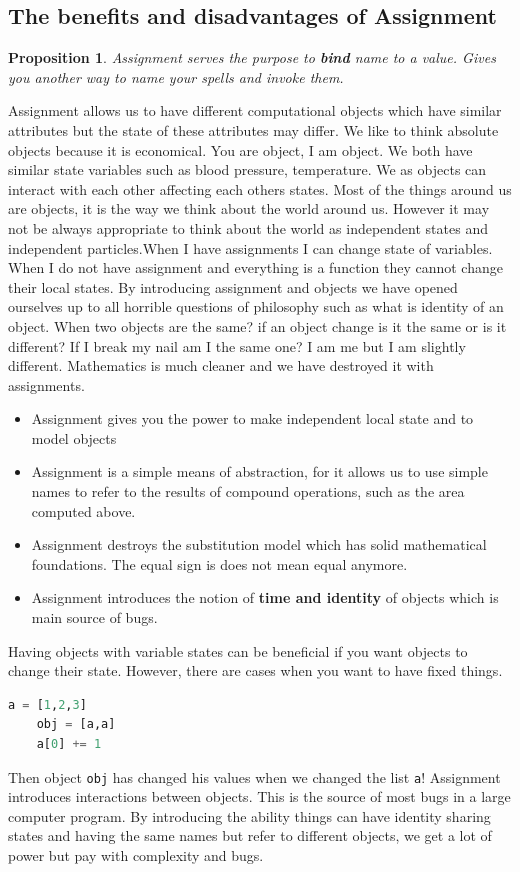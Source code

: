 \documentclass[a4paper,twoside]{article}
\newtheorem{proposition}[theorem]{Proposition}
\numberwithin{equation}{section}
\begin{document}
\subsection{The benefits and disadvantages of Assignment}
\begin{proposition}
    Assignment serves the purpose to \textbf{bind} name to a value. Gives you another way
    to name your spells and invoke them.
\end{proposition}


Assignment allows us to have different computational objects which have similar
attributes but the state of these attributes may differ. We like to think absolute
objects because it is economical. You are object, I am object. We both have similar state variables
such as blood pressure, temperature. We as objects can interact with each other affecting each others
states. Most of the things around us are objects, it is the way we think about the world around us.
However it may not be always appropriate to think about the world as independent states and
independent particles.When I have assignments I can change state of variables. When I do not have
assignment and everything is a function they cannot change their local states.
By introducing assignment and objects we have opened ourselves up to all horrible
questions of philosophy such as what is identity of an object. When two objects are the same?
if an object change is it the same or is it different? If I break my nail am I the same one? I am me
but I am slightly different. Mathematics is much cleaner and we have destroyed it with assignments.
\newline
\begin{itemize}
    \item Assignment gives you the power to make independent local state and to model objects
    \item Assignment is a simple means of abstraction, for it allows us to use simple names to
          refer to the results of compound operations, such as the area computed above.
    \item Assignment destroys the substitution model which has solid mathematical foundations.
          The equal sign is does not mean equal anymore.
    \item Assignment introduces the notion of \textbf{time and identity} of objects which is main source of bugs.
\end{itemize}
Having objects with variable states can be beneficial if you want objects to change their state.
However, there are cases when you want to have fixed things.
\begin{lstlisting}[language=Python]
    a = [1,2,3]
    obj = [a,a]
    a[0] += 1
\end{lstlisting}
Then object \texttt{obj} has changed his values when we changed the list \texttt{a}!
Assignment introduces interactions between objects. This is the source of most bugs in a large
computer program. By introducing the ability things can have identity sharing states
and having the same names but refer to different objects, we get a lot of power but pay with complexity
and bugs.
\end{document}
